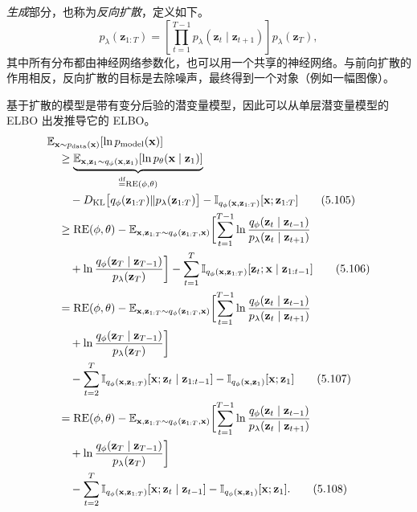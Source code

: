\emph{生成}部分，也称为\emph{反向扩散}，定义如下。
\begin{equation}
p_\lambda(\mathbf{z}_{1:T})=
 \left[\prod_{t=1}^{T-1}p_\lambda(\mathbf{z}_t\mid\mathbf{z}_{t+1})\right]p_\lambda(\mathbf{z}_T),
\tag{5.104}\label{eq:05-104}
\end{equation}
其中所有分布都由神经网络参数化，也可以用一个共享的神经网络。与前向扩散的作用相反，反向扩散的目标是去除噪声，最终得到一个对象（例如一幅图像）。

基于扩散的模型是带有变分后验的潜变量模型，因此可以从单层潜变量模型的 ELBO 出发推导它的 ELBO。
\begin{align}
&\mathbb{E}_{\mathbf{x}\sim p_{\mathrm{data}}(\mathbf{x})}[\ln p_{\mathrm{model}}(\mathbf{x})]\notag\\
 &\quad\geq\underbrace{\mathbb{E}_{\mathbf{x},\mathbf{z}_1\sim q_\phi(\mathbf{x},\mathbf{z}_1)}
                         [\ln p_\theta(\mathbf{x}\mid\mathbf{z}_1)]}
             _{\stackrel{\mathrm{df}}{=}\mathrm{RE}(\phi,\theta)}\notag\\
 &\qquad-D_{\mathrm{KL}}\bigl[q_\phi(\mathbf{z}_{1:T})\|p_\lambda(\mathbf{z}_{1:T})\bigr]
     -\mathbb{I}_{q_\phi(\mathbf{x},\mathbf{z}_{1:T})}[\mathbf{x};\mathbf{z}_{1:T}] \tag{5.105}\label{eq:05-105}\\
 &\quad\geq\mathrm{RE}(\phi,\theta)-\mathbb{E}_{\mathbf{x},\mathbf{z}_{1:T}\sim q_\phi(\mathbf{z}_{1:T},\mathbf{x})}
     \biggl[\sum_{t=1}^{T-1}\ln\frac{q_\phi(\mathbf{z}_t\mid\mathbf{z}_{t-1})}{p_\lambda(\mathbf{z}_t\mid\mathbf{z}_{t+1})}\notag\\
 &\qquad+\ln\frac{q_\phi(\mathbf{z}_T\mid\mathbf{z}_{T-1})}{p_\lambda(\mathbf{z}_T)}\biggr]
     -\sum_{t=1}^T\mathbb{I}_{q_\phi(\mathbf{x},\mathbf{z}_{1:T})}[\mathbf{z}_t;\mathbf{x}\mid\mathbf{z}_{1:t-1}]
    \tag{5.106}\label{eq:05-106}\\
 &\quad=\mathrm{RE}(\phi,\theta)-\mathbb{E}_{\mathbf{x},\mathbf{z}_{1:T}\sim q_\phi(\mathbf{z}_{1:T},\mathbf{x})}
     \biggl[\sum_{t=1}^{T-1}\ln\frac{q_\phi(\mathbf{z}_t\mid\mathbf{z}_{t-1})}{p_\lambda(\mathbf{z}_t\mid\mathbf{z}_{t+1})}\notag\\
 &\qquad+\ln\frac{q_\phi(\mathbf{z}_T\mid\mathbf{z}_{T-1})}{p_\lambda(\mathbf{z}_T)}\biggr]\notag\\
 &\qquad-\sum_{t=2}^T\mathbb{I}_{q_\phi(\mathbf{x},\mathbf{z}_{1:T})}[\mathbf{x};\mathbf{z}_t\mid\mathbf{z}_{1:t-1}]
    -\mathbb{I}_{q_\phi(\mathbf{x},\mathbf{z}_1)}[\mathbf{x};\mathbf{z}_1] \tag{5.107}\label{eq:05-107}\\
 &\quad=\mathrm{RE}(\phi,\theta)-\mathbb{E}_{\mathbf{x},\mathbf{z}_{1:T}\sim q_\phi(\mathbf{z}_{1:T},\mathbf{x})}
     \biggl[\sum_{t=1}^{T-1}\ln\frac{q_\phi(\mathbf{z}_t\mid\mathbf{z}_{t-1})}{p_\lambda(\mathbf{z}_t\mid\mathbf{z}_{t+1})}\notag\\
 &\qquad+\ln\frac{q_\phi(\mathbf{z}_T\mid\mathbf{z}_{T-1})}{p_\lambda(\mathbf{z}_T)}\biggr]\notag\\
 &\qquad-\sum_{t=2}^T\mathbb{I}_{q_\phi(\mathbf{x},\mathbf{z}_{1:T})}[\mathbf{x};\mathbf{z}_t\mid\mathbf{z}_{t-1}]
    -\mathbb{I}_{q_\phi(\mathbf{x},\mathbf{z}_1)}[\mathbf{x};\mathbf{z}_1]. \tag{5.108}\label{eq:05-108}
\end{align}
